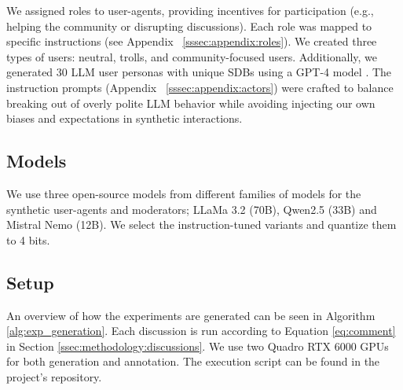 We assigned roles to user-agents, providing incentives for participation (e.g., helping the community or disrupting discussions). Each role was mapped to specific instructions (see Appendix ~\ref{sssec:appendix:roles}). We created three types of users: neutral, trolls, and community-focused users. Additionally, we generated 30 \ac{LLM} user personas with unique \acp{SDB} using a GPT-4 model \cite{openai2024gpt4technicalreport}. The instruction prompts (Appendix ~\ref{sssec:appendix:actors}) were crafted to balance breaking out of overly polite \ac{LLM} behavior while avoiding injecting our own biases and expectations in synthetic interactions.


\subsection{Models}
\label{ssec:experimental:model}

We use three open-source models from different families of models for the synthetic user-agents and moderators; LLaMa 3.2 (70B), Qwen2.5 (33B) and Mistral Nemo (12B). We select the instruction-tuned variants and quantize them to 4 bits.


\subsection{Setup}

An overview of how the experiments are generated can be seen in Algorithm \ref{alg:exp_generation}. Each discussion is run according to Equation \ref{eq:comment} in Section \ref{ssec:methodology:discussions}. We use two Quadro RTX 6000 GPUs for both generation and annotation. The execution script can be found in the project's repository\analysislink.

